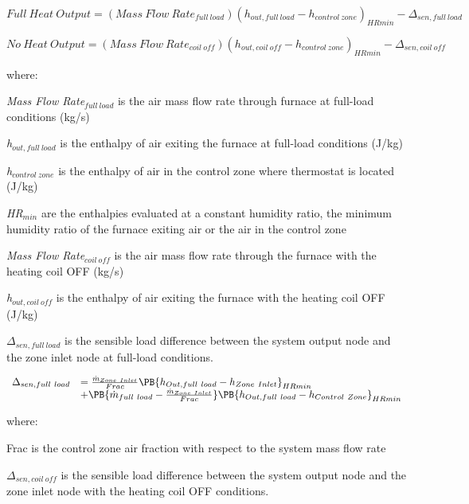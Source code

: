 \begin{equation}
Full~Heat~Output = (Mass~Flow~Rat{e_{full~load}}){({h_{out,full~load}} - {h_{control~zone}})_{HRmin}} - {\Delta_{sen,full~load}}
\end{equation}

\begin{equation}
No~Heat~Output = (Mass~Flow~Rat{e_{coil~off}}){({h_{out,coil~off}} - {h_{control~zone}})_{HRmin}} - {\Delta_{sen,coil~off}}
\end{equation}

where:

\emph{Mass Flow Rate\(_{full~load}\)} is the air mass flow rate through furnace at full-load conditions (kg/s)

\emph{h\(_{out,full~load}\)} is the enthalpy of air exiting the furnace at full-load conditions (J/kg)

\emph{h\(_{control~zone}\)} is the enthalpy of air in the control zone where thermostat is located (J/kg)

\emph{HR\(_{min}\)} are the enthalpies evaluated at a constant humidity ratio, the minimum humidity ratio of the furnace exiting air or the air in the control zone

\emph{Mass Flow Rate\(_{coil~off}\)} is the air mass flow rate through the furnace with the heating coil OFF (kg/s)

\emph{h\(_{out,coil~off}\)} is the enthalpy of air exiting the furnace with the heating coil OFF (J/kg)

\(\Delta_{sen,full~load}\) is the sensible load difference between the system output node and the zone inlet node at full-load conditions.

\begin{equation}
  \begin{array}{rl}
    \Delta_{sen,full~load} &= \frac{\dot{m}_{Zone~Inlet}}{Frac} \PB{h_{Out,full~load} - h_{Zone~Inlet}}_{HRmin} \\
                           &+ \PB{\dot{m}_{full~load} - \frac{\dot{m}_{Zone~Inlet}}{Frac}} \PB{h_{Out,full~load} - h_{Control~Zone}}_{HRmin}
  \end{array}
\end{equation}

where:

Frac is the control zone air fraction with respect to the system mass flow rate

\(\Delta_{sen,coil~off}\) is the sensible load difference between the system output node and the zone inlet node with the heating coil OFF conditions.

